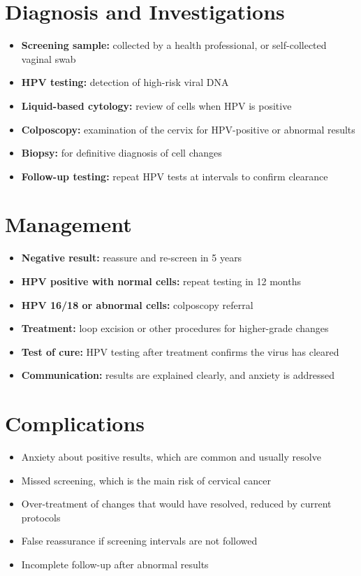 \section*{Diagnosis and Investigations}
\begin{itemize}
    \item \textbf{Screening sample:} collected by a health professional, or self-collected vaginal swab
    \item \textbf{HPV testing:} detection of high-risk viral DNA
    \item \textbf{Liquid-based cytology:} review of cells when HPV is positive
    \item \textbf{Colposcopy:} examination of the cervix for HPV-positive or abnormal results
    \item \textbf{Biopsy:} for definitive diagnosis of cell changes
    \item \textbf{Follow-up testing:} repeat HPV tests at intervals to confirm clearance
\end{itemize}

\section*{Management}
\begin{itemize}
    \item \textbf{Negative result:} reassure and re-screen in 5 years
    \item \textbf{HPV positive with normal cells:} repeat testing in 12 months
    \item \textbf{HPV 16/18 or abnormal cells:} colposcopy referral
    \item \textbf{Treatment:} loop excision or other procedures for higher-grade changes
    \item \textbf{Test of cure:} HPV testing after treatment confirms the virus has cleared
    \item \textbf{Communication:} results are explained clearly, and anxiety is addressed
\end{itemize}

\section*{Complications}
\begin{itemize}
    \item Anxiety about positive results, which are common and usually resolve
    \item Missed screening, which is the main risk of cervical cancer
    \item Over-treatment of changes that would have resolved, reduced by current protocols
    \item False reassurance if screening intervals are not followed
    \item Incomplete follow-up after abnormal results
\end{itemize}

